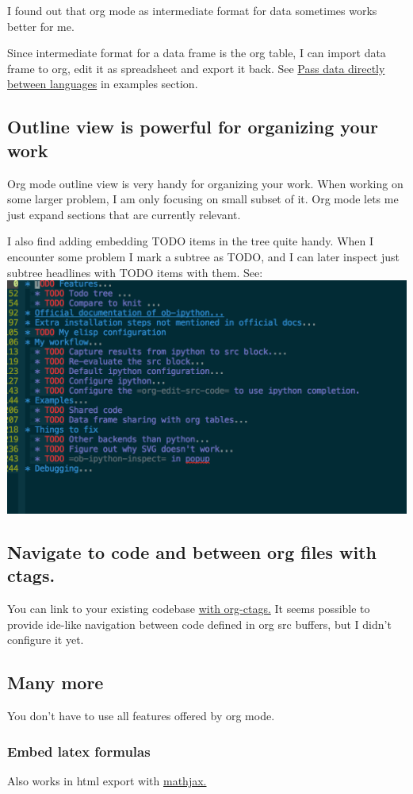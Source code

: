 \documentclass[11pt]{article}
\begin{document}
I found out that org mode as intermediate format for data sometimes works better for me.

Since intermediate format for a data frame is the org table, I can import data frame to org, edit it as spreadsheet and export it back.
See \hyperref[sec:orgheadline10]{Pass data directly between languages} in examples section.
\subsection{Outline view is powerful for organizing your work}
\label{sec:orgheadline12}
Org mode outline view is very handy for organizing your work.
When working on some larger problem, I am only focusing on small subset of it.
Org mode lets me just expand sections that are currently relevant.

I also find adding embedding TODO items in the tree quite handy.
When I encounter some problem I mark a subtree as TODO, and I can
later inspect just subtree headlines with TODO items with them.
See:
\includegraphics[width=.9\linewidth]{todo.png}
\subsection{Navigate to code and between org files with ctags.}
\label{sec:orgheadline13}
You can link to your existing codebase \href{http://orgmode.org/w/?p=org-mode.git;a=blob_plain;f=lisp/org-ctags.el;hb=HEAD}{with org-ctags.}
It seems possible to provide ide-like navigation between
code defined in org src buffers, but I didn't configure it yet.
\subsection{Many more}
\label{sec:orgheadline27}
You don't have to use all features offered by org mode.
\subsubsection{Embed latex formulas}
\label{sec:orgheadline14}
Also works in html export with \href{https://www.mathjax.org/}{mathjax.}
\end{document}
